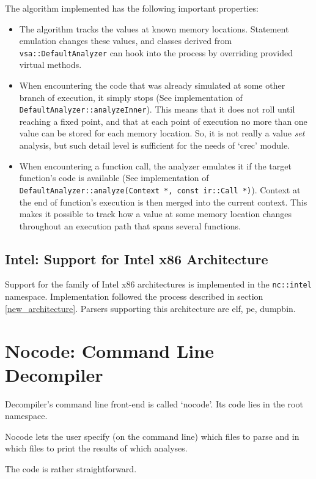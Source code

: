 \documentclass[a4paper,12pt]{article}
\newcommand{\ident}[1]{\texttt{#1}}
\begin{document}
The algorithm implemented has the following important properties:
\begin{itemize}
\item The algorithm tracks the values at known memory locations. 
	Statement emulation changes these values, and classes derived from \ident{vsa::DefaultAnalyzer} can hook into the process by overriding provided virtual methods.
\item When encountering the code that was already simulated at some other branch of execution, it simply stops (See implementation of \ident{DefaultAnalyzer::analyzeInner}). 
	This means that it does not roll until reaching a fixed point, and that at each point of execution no more than one value can be stored for each memory location. 
	So, it is not really a value \emph{set} analysis, but such detail level is sufficient for the needs of `crec' module.
\item When encountering a function call, the analyzer emulates it if the target function's code is available (See implementation of \ident{DefaultAnalyzer::analyze(Context *, const ir::Call *)}). 
	Context at the end of function's execution is then merged into the current context.
	This makes it possible to track how a value at some memory location changes throughout an execution path that spans several functions.
\end{itemize}

\subsection{Intel: Support for Intel x86 Architecture}

Support for the family of Intel x86 architectures is implemented in the \ident{nc::intel} namespace. 
Implementation followed the process described in section \ref{new_architecture}.
Parsers supporting this architecture are elf, pe, dumpbin.

\clearpage
\section{Nocode: Command Line Decompiler}

Decompiler's command line front-end is called `nocode'.
Its code lies in the root namespace.

Nocode lets the user specify (on the command line) which files to parse and in which files to print the results of which analyses.

The code is rather straightforward.
\end{document}
